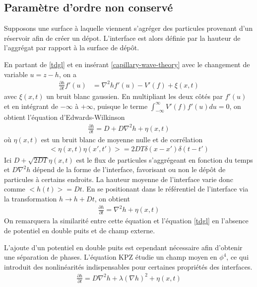     \subsection{Paramètre d'ordre non conservé}

Supposons une surface à laquelle viennent s'agréger des particules provenant d'un réservoir afin de créer un dépot. L'interface est alors définie par la hauteur de l'aggrégat par rapport à la surface de dépôt.

En partant de \ref{tdgl} et en insérant \ref{capillary-wave-theory} avec le changement de variable $u= z-h$, on a \cite{bray_interface_2001}
\begin{align}
    \frac{\partial h}{\partial t} f'(u) &= \nabla^2 h f'(u) - V'(f) + \xi(x,t)
\end{align}
avec $\xi(x,t)$ un bruit blanc gaussien. En multipliant les deux côtés par $f'(u)$ et en intégrant de $-\infty$ à $+\infty$, puisque le terme $ \int_{-\infty}^\infty V'(f) f'(u) du = 0$, on obtient l'équation d'Edwards-Wilkinson \cite{edwards_surface_1982} 
\begin{align}
     \frac{\partial h}{\partial t} = D + D \nabla^2 h +  \eta(x,t)
    \label{edwards-wilkinson}
\end{align}
où $\eta(x,t)$ est un bruit blanc de moyenne nulle et de corrélation 
\begin{align}
    <\eta(x,t)\eta(x',t')> = 2 D T\delta(x-x')\delta(t-t')
\end{align}
Ici $D+ \sqrt{2 D T} \eta(x,t)$ est le flux de particules s'aggrégeant en fonction du temps et $D \nabla^2 h$ dépend de la forme de l'interface, favorisant ou non le dépôt de particules à certains endroits.
La hauteur moyenne de l'interface varie donc comme $<h(t)> = Dt$. En se positionant dans le référentiel de l'interface via la transformation $h \rightarrow h + Dt$, on obtient
\begin{align}
     \frac{\partial h}{\partial t} =   \nabla^2 h +   \eta(x,t)
    \label{edwards-wilkinson-conesrved}
\end{align}
On remarquera la similarité entre cette équation et l'équation \ref{tdgl} en l'absence de potentiel en double puits et de champ externe.

L'ajoute d'un potentiel en double puits est cependant nécessaire afin d'obtenir une séparation de phases. L'équation KPZ\cite{kardar_dynamic_1986} étudie un champ moyen en $\phi^4$, ce qui introduit des nonlinéarités indispensables pour certaines propriétés des interfaces.
\begin{align}
     \frac{\partial h}{\partial t} = D \nabla^2 h +  \lambda (\nabla h)^2 + \eta(x,t)
    \label{kpz}
\end{align}

